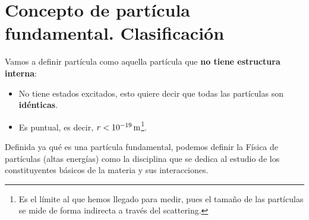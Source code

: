 \section{Concepto de partícula fundamental. Clasificación}
Vamos a definir partícula como aquella partícula que \textbf{no tiene estructura interna}:
\begin{itemize}
    \item No tiene estados excitados, esto quiere decir que todas las partículas son \textbf{idénticas}.
    \item Es puntual, es decir, $r<\unit[10^{-19}]{m}$\footnote{Es el límite al que hemos llegado para medir, pues el tamaño de las partículas se mide de forma indirecta a través del scattering.}.
\end{itemize}
Definida ya qué es una partícula fundamental, podemos definir la Física de partículas (altas energías) como la disciplina que se dedica al estudio de los constituyentes básicos de la materia y sus interacciones.

